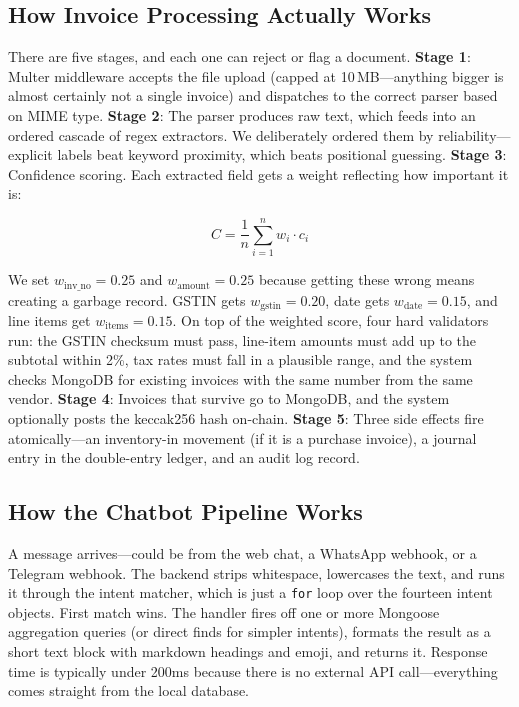 \documentclass[conference]{IEEEtran}
\begin{document}
\subsection{How Invoice Processing Actually Works}
There are five stages, and each one can reject or flag a document. \textbf{Stage 1}: Multer middleware accepts the file upload (capped at 10\,MB---anything bigger is almost certainly not a single invoice) and dispatches to the correct parser based on MIME type. \textbf{Stage 2}: The parser produces raw text, which feeds into an ordered cascade of regex extractors. We deliberately ordered them by reliability---explicit labels beat keyword proximity, which beats positional guessing. \textbf{Stage 3}: Confidence scoring. Each extracted field gets a weight reflecting how important it is:

\begin{equation}
C = \frac{1}{n} \sum_{i=1}^{n} w_i \cdot c_i
\end{equation}

We set $w_\text{inv\_no} = 0.25$ and $w_\text{amount} = 0.25$ because getting these wrong means creating a garbage record. GSTIN gets $w_\text{gstin} = 0.20$, date gets $w_\text{date} = 0.15$, and line items get $w_\text{items} = 0.15$. On top of the weighted score, four hard validators run: the GSTIN checksum must pass, line-item amounts must add up to the subtotal within 2\%, tax rates must fall in a plausible range, and the system checks MongoDB for existing invoices with the same number from the same vendor. \textbf{Stage 4}: Invoices that survive go to MongoDB, and the system optionally posts the keccak256 hash on-chain. \textbf{Stage 5}: Three side effects fire atomically---an inventory-in movement (if it is a purchase invoice), a journal entry in the double-entry ledger, and an audit log record.

\subsection{How the Chatbot Pipeline Works}
A message arrives---could be from the web chat, a WhatsApp webhook, or a Telegram webhook. The backend strips whitespace, lowercases the text, and runs it through the intent matcher, which is just a \texttt{for} loop over the fourteen intent objects. First match wins. The handler fires off one or more Mongoose aggregation queries (or direct finds for simpler intents), formats the result as a short text block with markdown headings and emoji, and returns it. Response time is typically under 200ms because there is no external API call---everything comes straight from the local database.
\end{document}
